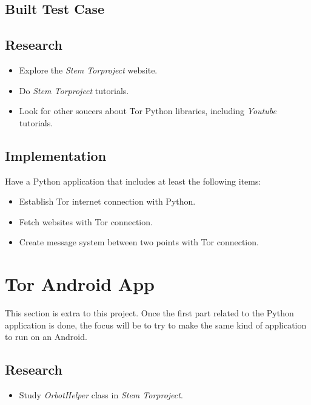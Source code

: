 \documentclass[a4paper, 11pt]{article}
\begin{document}
\subsection*{Built Test Case}

\subsection*{Research}

\begin{itemize}
    \item Explore the \textit{Stem Torproject}\cite{stem} website.
    \item Do \textit{Stem Torproject} tutorials.
    \item Look for other soucers about Tor Python libraries, including \textit{Youtube} tutorials.
\end{itemize}

\subsection*{Implementation}

Have a Python application that includes at least the following items:

\begin{itemize}
    \item Establish Tor internet connection with Python.
    \item Fetch websites with Tor connection.
    \item Create message system between two points with Tor connection.
\end{itemize}

\section*{Tor Android App}

This section is extra to this project. Once the first part related to the Python application is done, the focus will be to try to make the same kind of application to run on an Android.

\subsection*{Research}

\begin{itemize}
    \item Study \textit{OrbotHelper} class in \textit{Stem Torproject}\cite{stem}.
\end{itemize}
\end{document}
